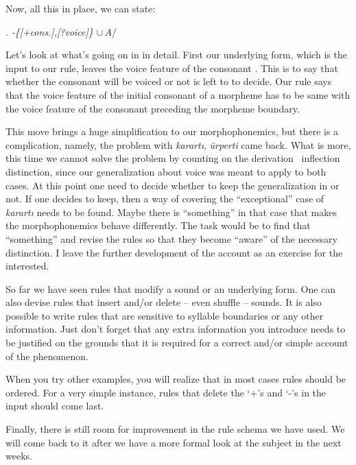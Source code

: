 \documentclass[11pt]{article}
\newcommand{\morphrule}[3]{{\it#1}\hspace{10pt}\sysm{\imp}\hspace{10pt}{\it#2}\hspace{10pt}/\hspace{10pt}{\it#3}}
\begin{document}
{\item[] Now, all this in place, we can state:
{\footnotesize
\ex.\label{varrule} \morphrule{-{\rm \{[+cons.],[?voice]\}} $\cup\, A$}{{\rm -\{[+cons.],[$\alpha$voice]\} $\,\cup\, A$}}{$Z\, \cup$  {\rm \{[$\alpha$voice]\}}\cntx}

}
\item Let's look at what's going on in  in detail. First our
underlying form, which is the input to our rule, leaves the voice feature of the
consonant . This is to say that whether the consonant will
be voiced or not is left to  to decide. Our rule says that the
voice feature of the initial consonant of a morpheme has to be same with the
voice feature of the consonant preceding the morpheme boundary. 

\item This move brings a huge simplification to our morphophonemics, but there
is a complication, namely, the problem with \emph{karart\i}, \emph{\"urperti}
came back. What is more, this time we cannot solve the problem by counting on
the derivation \versus\ inflection distinction, since our generalization about
voice was meant to apply to both cases. At this point one need to decide whether
to keep the generalization in  or not. If one decides to keep,
then a way of covering the ``exceptional'' case of \emph{karart\i} needs to be
found. Maybe there is ``something'' in that case that makes the morphophonemics
behave differently. The task would be to find that ``something'' and revise the
rules so that they become ``aware'' of the necessary distinction. I leave the
further development of the account as an exercise for the interested.   

\item So far we have seen rules that modify a sound or an underlying form. One
can also devise rules that insert and/or delete -- even shuffle -- sounds. It is
also possible to write rules that are sensitive to syllable boundaries or any
other information. Just don't forget that any extra information you introduce
needs to be justified on the grounds that it is required for a correct and/or
simple account of the phenomenon.

\item When you try other examples, you will realize that in most cases rules
should be ordered. For a very simple instance, rules that delete the `+'s and
`-'s in the input should come last.

\item Finally, there is still room for improvement in the rule schema we have used. We
will come back to it after we have a more formal look at the subject in the next
weeks.

}
\end{document}
